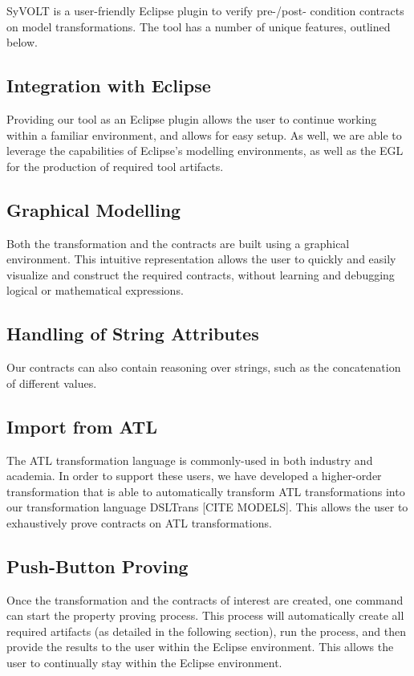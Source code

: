 SyVOLT is a user-friendly Eclipse plugin to verify pre-/post- condition contracts on model transformations. The tool has a number of unique features, outlined below.

\subsection{Integration with Eclipse}

Providing our tool as an Eclipse plugin allows the user to continue working within a familiar environment, and allows for easy setup. As well, we are able to leverage the capabilities of Eclipse's modelling environments, as well as the EGL for the production of required tool artifacts.

\subsection{Graphical Modelling}
Both the transformation and the contracts are built using a graphical environment. This intuitive representation allows the user to quickly and easily visualize and construct the required contracts, without learning and debugging logical or mathematical expressions.

\subsection{Handling of String Attributes}
Our contracts can also contain reasoning over strings, such as the concatenation of different values.


\subsection{Import from ATL}
The ATL transformation language is commonly-used in both industry and academia. In order to support these users, we have developed a higher-order transformation that is able to automatically transform ATL transformations into our transformation language DSLTrans [CITE MODELS]. This allows the user to exhaustively prove contracts on ATL transformations.

\subsection{Push-Button Proving}
Once the transformation and the contracts of interest are created, one command can start the property proving process. This process will automatically create all required artifacts (as detailed in the following section), run the process, and then provide the results to the user within the Eclipse environment. This allows the user to continually stay within the Eclipse environment.

